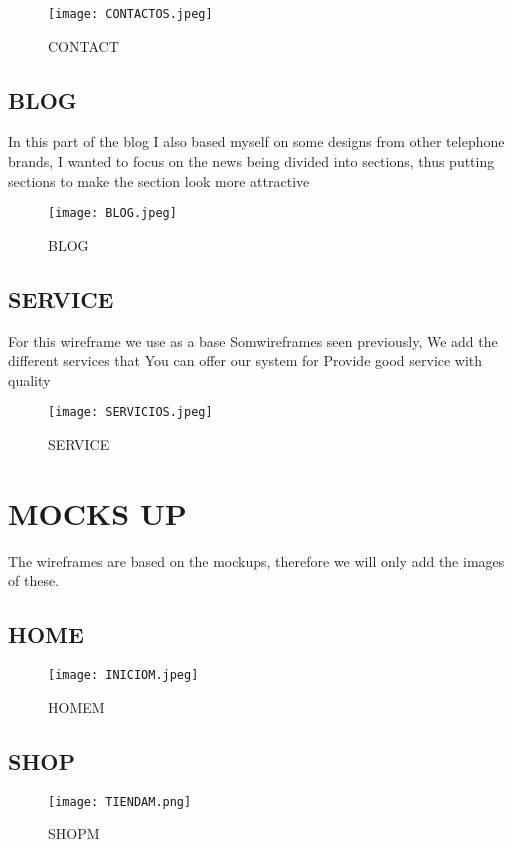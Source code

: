 \documentclass[journal]{IEEEtran}
\begin{document}
\begin{figure}[h]
    \centering
 \texttt{[image: CONTACTOS.jpeg]}
    \caption{CONTACT  }
    \label{fig:ejemplo}
\end{figure}

\subsection{BLOG}
In this part of the blog I also based myself on some designs from other telephone brands, I wanted to focus on the news being divided into sections, thus putting sections to make the section look more attractive

\begin{figure}[h]
    \centering
 \texttt{[image: BLOG.jpeg]}
    \caption{BLOG  }
    \label{fig:ejemplo}
\end{figure}

\subsection{SERVICE}
For this wireframe we use as a base Somwireframes seen previously, We add the different services that You can offer our system for Provide good service with quality

\begin{figure}[h]
    \centering
 \texttt{[image: SERVICIOS.jpeg]}
    \caption{SERVICE}
    \label{fig:ejemplo}
\end{figure}

\section{MOCKS UP}
The wireframes are based on the mockups, therefore we will only add the images of these.

\subsection{HOME}
\begin{figure}[h]
    \centering
    \texttt{[image: INICIOM.jpeg]}
    \caption{HOMEM}
    \label{fig:ejemplo}
\end{figure}

\subsection{SHOP}
\begin{figure}[h]
    \centering
    \texttt{[image: TIENDAM.png]}
    \caption{SHOPM}
    \label{fig:ejemplo}
\end{figure}
\newpage
\end{document}
